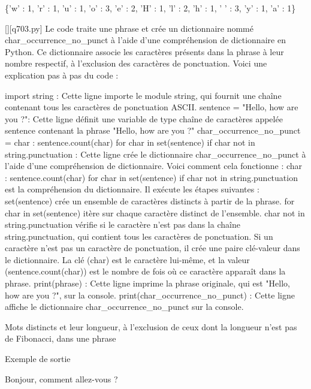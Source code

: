 \{'w' : 1, 'r' : 1, 'u' : 1, 'o' : 3, 'e' : 2, 'H' : 1, 'l' : 2, 'h' : 1, ' ' : 3, 'y' : 1, 'a' : 1\}
        \par
        \begin{solution}
            \renewcommand{\nomfichier}{q703.py}
            \pythonfile{\chemincode \nomfichier}[][\nomfichier]
            Le code traite une phrase et crée un dictionnaire nommé char_occurrence_no_punct à l'aide d'une compréhension de dictionnaire en Python. Ce dictionnaire associe les caractères présents dans la phrase à leur nombre respectif, à l'exclusion des caractères de ponctuation. Voici une explication pas à pas du code :

    import string : Cette ligne importe le module string, qui fournit une chaîne contenant tous les caractères de ponctuation ASCII.
    sentence = "Hello, how are you ?": Cette ligne définit une variable de type chaîne de caractères appelée sentence contenant la phrase "Hello, how are you ?"
    char_occurrence_no_punct = {char : sentence.count(char) for char in set(sentence) if char not in string.punctuation} : Cette ligne crée le dictionnaire char_occurrence_no_punct à l'aide d'une compréhension de dictionnaire. Voici comment cela fonctionne :
        {char : sentence.count(char) for char in set(sentence) if char not in string.punctuation} est la compréhension du dictionnaire. Il exécute les étapes suivantes :
        set(sentence) crée un ensemble de caractères distincts à partir de la phrase.
        for char in set(sentence) itère sur chaque caractère distinct de l'ensemble.
        char not in string.punctuation vérifie si le caractère n'est pas dans la chaîne string.punctuation, qui contient tous les caractères de ponctuation.
        Si un caractère n'est pas un caractère de ponctuation, il crée une paire clé-valeur dans le dictionnaire. La clé (char) est le caractère lui-même, et la valeur (sentence.count(char)) est le nombre de fois où ce caractère apparaît dans la phrase.
    print(phrase) : Cette ligne imprime la phrase originale, qui est "Hello, how are you ?", sur la console.
    print(char_occurrence_no_punct) : Cette ligne affiche le dictionnaire char_occurrence_no_punct sur la console.
        \end{solution}
        

        \question
        Mots distincts et leur longueur, à l'exclusion de ceux dont la longueur n'est pas de Fibonacci, dans une phrase

Exemple de sortie

Bonjour, comment allez-vous ?

